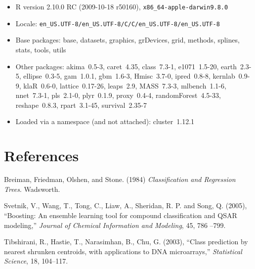 \documentclass[12pt]{article}
\begin{document}
\begin{itemize}\raggedright
  \item R version 2.10.0 RC (2009-10-18 r50160), \verb|x86_64-apple-darwin9.8.0|
  \item Locale: \verb|en_US.UTF-8/en_US.UTF-8/C/C/en_US.UTF-8/en_US.UTF-8|
  \item Base packages: base, datasets, graphics, grDevices, grid,
    methods, splines, stats, tools, utils
  \item Other packages: akima~0.5-3, caret~4.35, class~7.3-1,
    e1071~1.5-20, earth~2.3-5, ellipse~0.3-5, gam~1.0.1, gbm~1.6-3,
    Hmisc~3.7-0, ipred~0.8-8, kernlab~0.9-9, klaR~0.6-0,
    lattice~0.17-26, leaps~2.9, MASS~7.3-3, mlbench~1.1-6, nnet~7.3-1,
    pls~2.1-0, plyr~0.1.9, proxy~0.4-4, randomForest~4.5-33,
    reshape~0.8.3, rpart~3.1-45, survival~2.35-7
  \item Loaded via a namespace (and not attached): cluster~1.12.1
\end{itemize}

\section{References}

\begin{description}

   
   \item Breiman, Friedman, Olshen, and Stone. (1984) {\it Classification and Regression Trees}. Wadsworth.


   \item Svetnik, V., Wang, T., Tong, C., Liaw, A., Sheridan, R. P. and Song, Q. (2005), ``Boosting: An ensemble learning tool for compound classification and QSAR modeling,'' {\it Journal of Chemical Information and Modeling}, 45, 786 --799.
   
   \item Tibshirani, R., Hastie, T., Narasimhan, B., Chu, G. (2003), ``Class prediction by nearest shrunken centroids, with applications to DNA microarrays,'' {\it  Statistical Science}, 18, 104--117.


\end{description}
\end{document}

